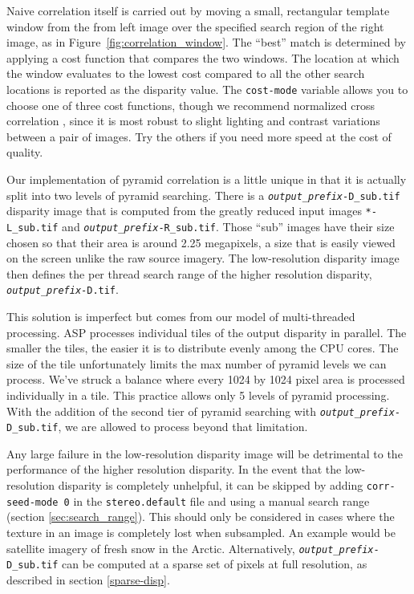 Naive correlation itself is carried out by moving a small, rectangular
template window from the from left image over the specified search
region of the right image, as in Figure~\ref{fig:correlation_window}.
The ``best'' match is determined by applying a cost function that
compares the two windows. The location at which the window evaluates
to the lowest cost compared to all the other search locations is
reported as the disparity value. The \texttt{cost-mode} variable allows you
to choose one of three cost functions, though we recommend normalized
cross correlation \citep{Menard97:robust}, since it is most robust to
slight lighting and contrast variations between a pair of
images. Try the others if you need more speed at the cost of quality.

Our implementation of pyramid correlation is a little unique in that
it is actually split into two levels of pyramid searching. There is a
\texttt{\textit{output\_prefix}-D\_sub.tif} disparity image that is
computed from the greatly reduced input images \texttt{*-L\_sub.tif}
and \texttt{\textit{output\_prefix}-R\_sub.tif}. Those ``sub'' images
have their size chosen so that their area is around 2.25 megapixels,
a size that is easily viewed on the screen unlike the raw source
imagery. The low-resolution disparity image then defines the per
thread search range of the higher resolution disparity,
\texttt{\textit{output\_prefix}-D.tif}.

This solution is imperfect but comes from our model of multi-threaded
processing. ASP processes individual tiles of the output disparity
in parallel. The smaller the tiles, the easier it is to distribute
evenly among the CPU cores. The size of the tile unfortunately
limits the max number of pyramid levels we can process. We've struck
a balance where every 1024 by 1024 pixel area is processed individually
in a tile. This practice allows only 5 levels of pyramid processing.
With the addition of the second tier of pyramid searching with
\texttt{\textit{output\_prefix}-D\_sub.tif}, we are allowed to
process beyond that limitation.

Any large failure in the low-resolution disparity image will be
detrimental to the performance of the higher resolution disparity. In
the event that the low-resolution disparity is completely unhelpful, it
can be skipped by adding \texttt{corr-seed-mode 0} in the
\texttt{stereo.default} file and using a manual search range (section
\ref{sec:search_range}). This should only be considered in cases where
the texture in an image is completely lost when subsampled. An example
would be satellite imagery of fresh snow in the Arctic. Alternatively,
\texttt{\textit{output\_prefix}-D\_sub.tif} can be computed at a sparse
set of pixels at full resolution, as described in section
\ref{sparse-disp}.

